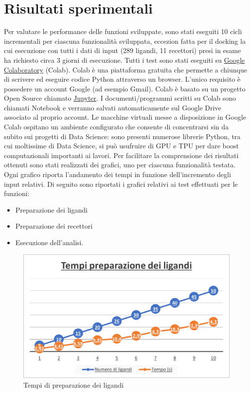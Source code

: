 \chapter{Risultati sperimentali}
Per valutare le performance delle funzioni sviluppate, sono stati eseguiti 10 cicli incrementali per ciascuna funzionalità sviluppata, eccezion fatta per il docking la cui esecuzione con tutti i dati di input (289 ligandi, 11 recettori) presi in esame ha richiesto circa 3 giorni di esecuzione.\newline
Tutti i test sono stati eseguiti su \href{https://colab.research.google.com/}{Google Colaboratory} (Colab). Colab è una piattaforma gratuita che permette a chiunque di scrivere ed eseguire codice Python attraverso un browser. L’unico requisito è possedere un account Google (ad esempio Gmail). Colab è basato su un progetto Open Source chiamato \href{https://jupyter.org/}{Jupyter}. I documenti/programmi scritti su Colab sono chiamati Notebook e verranno salvati automaticamente sul Google Drive associato al proprio account.\newline
Le macchine virtuali messe a disposizione in Google Colab ospitano un ambiente configurato che consente di concentrarsi sin da subito sui progetti di Data Science:  sono presenti numerose librerie Python, tra cui moltissime di Data Science, si può usufruire di GPU e TPU per dare boost computazionali importanti ai lavori.\newline
Per facilitare la comprensione dei risultati ottenuti sono stati realizzati dei grafici, uno per ciascuna funzionalità testata.\newline
Ogni grafico riporta l'andamento dei tempi in funzione dell'incremento degli input relativi.\newline
Di seguito sono riportati i grafici relativi ai test effettuati per le funzioni:
\begin{itemize}
    \item Preparazione dei ligandi
    \item Preparazione dei recettori
    \item Esecuzione dell'analisi.
\end{itemize}

\begin{figure}[H]
    \centering
    \includegraphics{immagini/capitolo4/tempiLigandi.png}
    \caption{Tempi di preparazione dei ligandi}
    \label{fig:tempi ligandi}
\end{figure}

